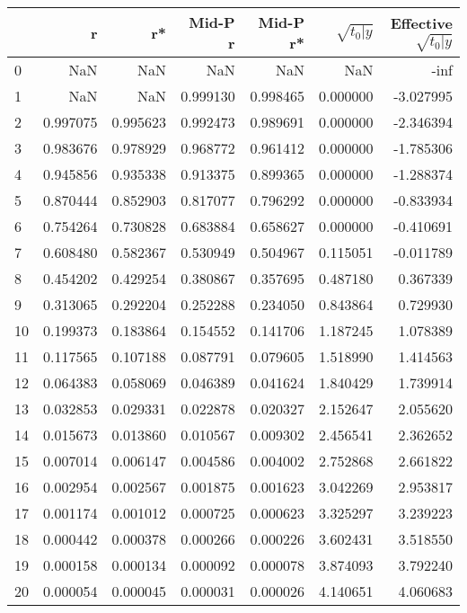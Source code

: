 \begin{tabular}{lrrrrrr}
\toprule
 & r & r* & Mid-P r & Mid-P r* & $\sqrt{t_0\vert y}$ & Effective $\sqrt{t_0\vert y}$ \\
\midrule
0 & NaN & NaN & NaN & NaN & NaN & -inf \\
1 & NaN & NaN & 0.999130 & 0.998465 & 0.000000 & -3.027995 \\
2 & 0.997075 & 0.995623 & 0.992473 & 0.989691 & 0.000000 & -2.346394 \\
3 & 0.983676 & 0.978929 & 0.968772 & 0.961412 & 0.000000 & -1.785306 \\
4 & 0.945856 & 0.935338 & 0.913375 & 0.899365 & 0.000000 & -1.288374 \\
5 & 0.870444 & 0.852903 & 0.817077 & 0.796292 & 0.000000 & -0.833934 \\
6 & 0.754264 & 0.730828 & 0.683884 & 0.658627 & 0.000000 & -0.410691 \\
7 & 0.608480 & 0.582367 & 0.530949 & 0.504967 & 0.115051 & -0.011789 \\
8 & 0.454202 & 0.429254 & 0.380867 & 0.357695 & 0.487180 & 0.367339 \\
9 & 0.313065 & 0.292204 & 0.252288 & 0.234050 & 0.843864 & 0.729930 \\
10 & 0.199373 & 0.183864 & 0.154552 & 0.141706 & 1.187245 & 1.078389 \\
11 & 0.117565 & 0.107188 & 0.087791 & 0.079605 & 1.518990 & 1.414563 \\
12 & 0.064383 & 0.058069 & 0.046389 & 0.041624 & 1.840429 & 1.739914 \\
13 & 0.032853 & 0.029331 & 0.022878 & 0.020327 & 2.152647 & 2.055620 \\
14 & 0.015673 & 0.013860 & 0.010567 & 0.009302 & 2.456541 & 2.362652 \\
15 & 0.007014 & 0.006147 & 0.004586 & 0.004002 & 2.752868 & 2.661822 \\
16 & 0.002954 & 0.002567 & 0.001875 & 0.001623 & 3.042269 & 2.953817 \\
17 & 0.001174 & 0.001012 & 0.000725 & 0.000623 & 3.325297 & 3.239223 \\
18 & 0.000442 & 0.000378 & 0.000266 & 0.000226 & 3.602431 & 3.518550 \\
19 & 0.000158 & 0.000134 & 0.000092 & 0.000078 & 3.874093 & 3.792240 \\
20 & 0.000054 & 0.000045 & 0.000031 & 0.000026 & 4.140651 & 4.060683 \\
\bottomrule
\end{tabular}
